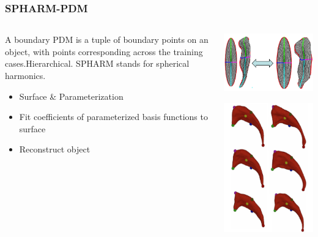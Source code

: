 \documentclass{beamer}
\begin{document}
\begin{frame}
\frametitle{SPHARM-PDM}
\begin{columns}
\begin{column}{0.5\textwidth}
A boundary PDM is a tuple of boundary points on an object, with points corresponding across the training cases.Hierarchical. SPHARM stands for spherical harmonics.
\begin{itemize}
    \item Surface \& Parameterization
    \item Fit coefficients of parameterized basis functions to surface
    \item Reconstruct object
\end{itemize}
\end{column}
\begin{column}{0.5\textwidth}
\begin{center}
    \includegraphics[width=0.5\linewidth]{SPHARM1.png}
\end{center}
\begin{center}
    \includegraphics[width=0.5\linewidth]{SPHARM2.png}
\end{center}
\end{column}
\end{columns}
\end{frame}
\end{document}
